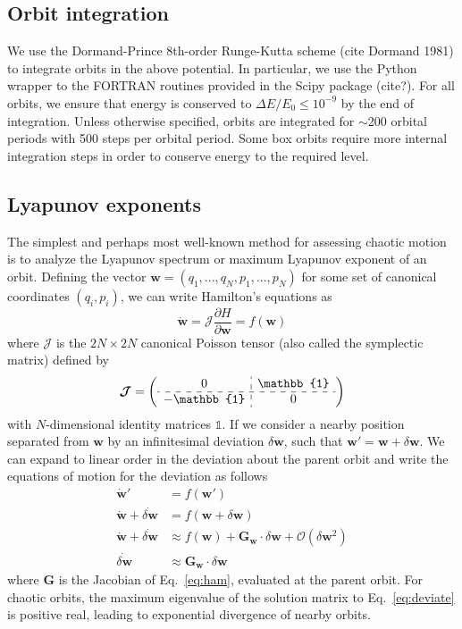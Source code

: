 \documentclass[letterpaper,12pt,preprint]{aastex}
\newcommand{\bs}[1]{\boldsymbol{#1}}
\newcommand{\ident}{\mathbb{1}}
\newcommand{\jac}{\bs{G}}
\begin{document}
\subsection{Orbit integration}

We use the Dormand-Prince 8th-order Runge-Kutta scheme (cite Dormand 1981) to integrate orbits in the above potential. In particular, we use the Python wrapper to the FORTRAN routines provided in the Scipy package (cite?). For all orbits, we ensure that energy is conserved to $\Delta E/E_0 \leq 10^{-9}$ by the end of integration. Unless otherwise specified, orbits are integrated for $\sim$200 orbital periods with 500 steps per orbital period. Some box orbits require more internal integration steps in order to conserve energy to the required level. 

\subsection{Lyapunov exponents}

The simplest and perhaps most well-known method for assessing chaotic motion is to analyze the Lyapunov spectrum or maximum Lyapunov exponent of an orbit. Defining the vector $\bs{w} = (q_1,...,q_N,p_1,...,p_N)$ for some set of canonical coordinates $(q_i,p_i)$, we can write Hamilton's equations as 
\begin{equation}
	\dot{\bs{w}} = \bs{\mathcal{J}} \frac{\partial H}{\partial \bs{w}} = f(\bs{w}) \label{eq:ham}
\end{equation}
where $\bs{\mathcal{J}}$ is the $2N \times 2N$ canonical Poisson tensor (also called the symplectic matrix) defined by
\begin{equation}
	\bs{\mathcal{J}} = \left( \begin{array}{c:c} 0 & \ident \\ \hdashline -\ident & 0 \end{array} \right)
\end{equation}
with $N$-dimensional identity matrices $\ident$. If we consider a nearby position separated from $\bs{w}$ by an infinitesimal deviation $\delta \bs{w}$, such that $\bs{w}' = \bs{w} + \delta \bs{w}$. We can expand to linear order in the deviation about the parent orbit and write the equations of motion for the deviation as follows
\begin{align}
	\dot{\bs{w}}' &= f(\bs{w}')\\
	\dot{\bs{w}} + \dot{\delta \bs{w}} &= f(\bs{w} +  \delta \bs{w})\\
	\dot{\bs{w}} + \dot{\delta \bs{w}} &\approx f(\bs{w}) + \jac_{\bs{w}}\cdot\delta \bs{w} + \mathcal{O}(\delta \bs{w}^2)\\
	\dot{\delta \bs{w}} &\approx \jac_{\bs{w}} \cdot  \delta \bs{w}\label{eq:deviate}
\end{align}
where $\jac$ is the Jacobian of Eq.~\ref{eq:ham}, evaluated at the parent orbit. For chaotic orbits, the maximum eigenvalue of the solution matrix to Eq.~\ref{eq:deviate} is positive real, leading to exponential divergence of nearby orbits. 
\end{document}
